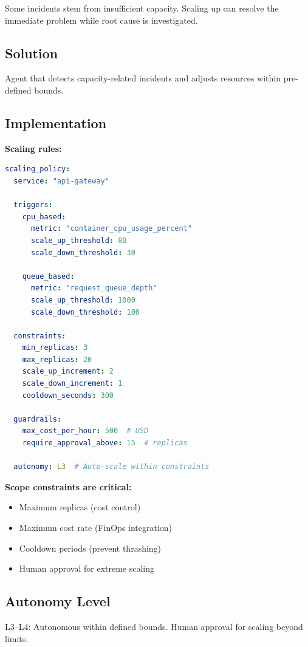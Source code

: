 Some incidents stem from insufficient capacity. Scaling up can resolve the immediate problem while root cause is investigated.

\subsection{Solution}

Agent that detects capacity-related incidents and adjusts resources within pre-defined bounds.

\subsection{Implementation}

\textbf{Scaling rules:}

\begin{lstlisting}[language=yaml,caption={Capacity Scaling Policy}]
scaling_policy:
  service: "api-gateway"

  triggers:
    cpu_based:
      metric: "container_cpu_usage_percent"
      scale_up_threshold: 80
      scale_down_threshold: 30

    queue_based:
      metric: "request_queue_depth"
      scale_up_threshold: 1000
      scale_down_threshold: 100

  constraints:
    min_replicas: 3
    max_replicas: 20
    scale_up_increment: 2
    scale_down_increment: 1
    cooldown_seconds: 300

  guardrails:
    max_cost_per_hour: 500  # USD
    require_approval_above: 15  # replicas

  autonomy: L3  # Auto-scale within constraints
\end{lstlisting}

\textbf{Scope constraints are critical:}
\begin{itemize}
    \item Maximum replicas (cost control)
    \item Maximum cost rate (FinOps integration)
    \item Cooldown periods (prevent thrashing)
    \item Human approval for extreme scaling
\end{itemize}

\subsection{Autonomy Level}

L3--L4: Autonomous within defined bounds. Human approval for scaling beyond limits.

